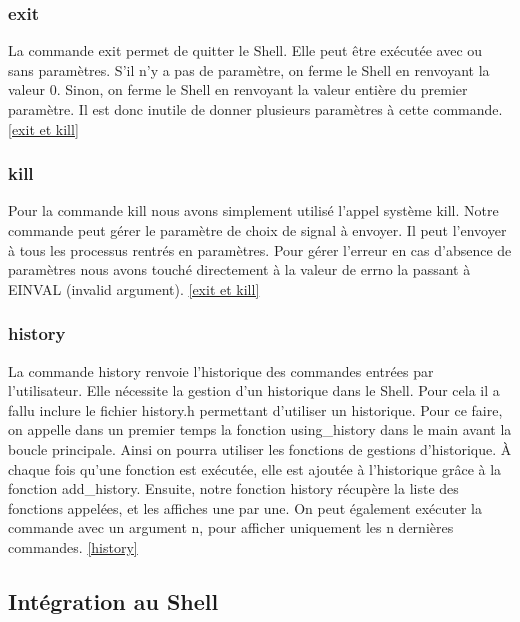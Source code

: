 \documentclass[12pt]{article}
\begin{document}
 \subsubsection{exit}
 La commande exit permet de quitter le Shell. 
 Elle peut être exécutée avec ou sans paramètres. 
 S'il n'y a pas de paramètre, on ferme le Shell en renvoyant la valeur 0. 
 Sinon, on ferme le Shell en renvoyant la valeur entière du premier paramètre. Il est donc inutile de donner plusieurs paramètres à cette commande. \ref{exit et kill}
 
 \subsubsection{kill}
 Pour la commande kill nous avons simplement utilisé l'appel système kill. 
 Notre commande peut gérer le paramètre de choix de signal à envoyer. Il peut l'envoyer à tous les processus
 rentrés en paramètres.
 Pour gérer l'erreur en cas d'absence de paramètres nous avons touché directement à la valeur
 de errno la passant à EINVAL (invalid argument). \ref{exit et kill}
 
 \subsubsection{history}
 La commande history renvoie l'historique des commandes entrées par l'utilisateur. 
 Elle nécessite la gestion d'un historique dans le Shell. 
 Pour cela il a fallu inclure le fichier history.h permettant d'utiliser un historique. 
 Pour ce faire, on appelle dans un premier temps la fonction using\_history dans le main avant la boucle principale.
 Ainsi on pourra utiliser les fonctions de gestions d'historique. 
 À chaque fois qu'une fonction est exécutée, elle est ajoutée à l'historique grâce à la fonction add\_history. 
 Ensuite, notre fonction history récupère la liste des fonctions appelées, et les affiches une par une. 
 On peut également exécuter la commande avec un argument n, pour afficher uniquement les n dernières commandes. \ref{history}
 
 \subsection{Intégration au Shell}
 
\end{document}

